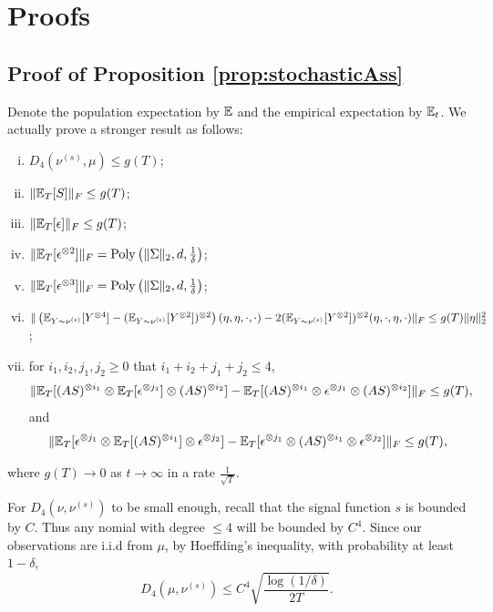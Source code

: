\onecolumn
\appendix

\section{Proofs}
\label{sec:Appendix}
\subsection{Proof of Proposition \ref{prop:stochasticAss}}
\label{subsec:proofPropA1}
Denote the population expectation by $\mathbb{E}$ and the empirical expectation by $\mathbb{E}_t$. We actually prove a stronger result as follows:
\begin{enumerate}[(i).]
\item $D_4(\nu^{(s)}, \mu)\le g(T)$;
\item $\| \mathbb{E}_T[S] \|_F \le g(T)$;
\item $\| \mathbb{E}_T[\epsilon] \|_F \le g(T)$; 
\item $\| \mathbb{E}_T[\epsilon^{\otimes 2}] \|_F  = \operatorname{Poly}\left(\|\Sigma\|_2,d,\frac{1}{\delta}\right)$;
\item $\| \mathbb{E}_T[\epsilon^{\otimes 3}] \|_F  = \operatorname{Poly}\left(\|\Sigma\|_2,d,\frac{1}{\delta}\right)$;
\item $\| \left(\mathbb{E}_{Y\sim \nu^{(\epsilon)}} [Y^{\otimes4}] - (\mathbb{E}_{Y\sim \nu^{(\epsilon)}} [Y^{\otimes2}])^{\otimes 2}\right)(\eta,\eta,\cdot,\cdot)  - 2 (\mathbb{E}_{Y\sim \nu^{(\epsilon)}} [Y^{\otimes2}])^{\otimes 2}(\eta,\cdot,\eta,\cdot)\|_F\le  g(T) \|\eta\|_2^2$;
\item for $i_1,i_2,j_1,j_2 \ge 0$ that $i_1+i_2+j_1+j_2 \le 4$,  
\begin{align*}
\| \mathbb{E}_T[(AS)^{\otimes i_1} \otimes \mathbb{E}_T[\epsilon^{\otimes j_1}] \otimes (AS)^{\otimes i_2}] - \mathbb{E}_T[(AS)^{\otimes i_1}\otimes \epsilon^{\otimes j_1}\otimes (AS)^{\otimes i_2}]  \|_F \le  g(T),
\end{align*}
and 
\begin{align*}
\| \mathbb{E}_T[\epsilon^{\otimes j_1} \otimes \mathbb{E}_T[(AS)^{\otimes i_1}] \otimes \epsilon^{\otimes j_2}] - \mathbb{E}_T[ \epsilon^{\otimes j_1}\otimes (AS)^{\otimes i_1}\otimes \epsilon^{\otimes j_2}]  \|_F \le  g(T),
\end{align*}
\end{enumerate}
where $g(T)\rightarrow 0$ as $t\rightarrow \infty$ in a rate $\frac{1}{\sqrt{T}}$. 

For $D_4(\nu, \nu^{(s)})$ to be small enough, recall that the signal function $s$ is bounded by $C$. 
Thus any nomial with degree $\le 4$ will be bounded by $C^4$. Since our observations are i.i.d from $\mu$, by Hoeffding's inequality, with probability at least $1-\delta$, 
\[
D_4(\mu, \nu^{(s)}) \le  C^4\sqrt{\frac{\log(1/\delta)}{2T}}.
\]

